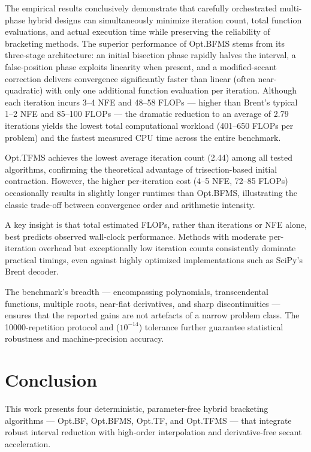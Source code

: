 \documentclass[amsmath, amssymb, aps]{revtex4-2}
\begin{document}
The empirical results conclusively demonstrate that carefully orchestrated multi-phase hybrid designs can simultaneously minimize iteration count, total function evaluations, and actual execution time while preserving the reliability of bracketing methods. The superior performance of Opt.BFMS stems from its three-stage architecture: an initial bisection phase rapidly halves the interval, a false-position phase exploits linearity when present, and a modified-secant correction delivers convergence significantly faster than linear (often near-quadratic) with only one additional function evaluation per iteration. Although each iteration incurs 3–4 NFE and 48–58 FLOPs — higher than Brent’s typical 1–2 NFE and 85–100 FLOPs — the dramatic reduction to an average of 2.79 iterations yields the lowest total computational workload (401–650 FLOPs per problem) and the fastest measured CPU time across the entire benchmark.

Opt.TFMS achieves the lowest average iteration count (2.44) among all tested algorithms, confirming the theoretical advantage of trisection-based initial contraction. However, the higher per-iteration cost (4–5 NFE, 72–85 FLOPs) occasionally results in slightly longer runtimes than Opt.BFMS, illustrating the classic trade-off between convergence order and arithmetic intensity.

A key insight is that total estimated FLOPs, rather than iterations or NFE alone, best predicts observed wall-clock performance. Methods with moderate per-iteration overhead but exceptionally low iteration counts consistently dominate practical timings, even against highly optimized implementations such as SciPy’s Brent decoder.

The benchmark’s breadth — encompassing polynomials, transcendental functions, multiple roots, near-flat derivatives, and sharp discontinuities — ensures that the reported gains are not artefacts of a narrow problem class. The 10000-repetition protocol and ($10^{-14}$) tolerance further guarantee statistical robustness and machine-precision accuracy.

\section{Conclusion}\label{sec:conclusion}

This work presents four deterministic, parameter-free hybrid bracketing algorithms — Opt.BF, Opt.BFMS, Opt.TF, and Opt.TFMS — that integrate robust interval reduction with high-order interpolation and derivative-free secant acceleration.
\end{document}
